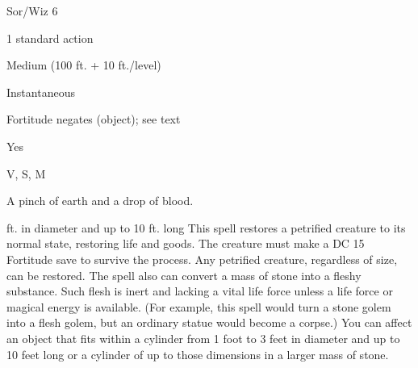 
\begin{description*}
\item[Level:] Sor/Wiz 6
\item[Casting Time:] 1 standard action
\item[Range:] Medium (100 ft. + 10 ft./level)
\item[Duration:] Instantaneous
\item[Saving Throw:] Fortitude negates (object); see text
\item[Spell Resistance:] Yes
\item[Components:] V, S, M
\item[Arcane Material Component:] A pinch of earth and a drop of blood.
\end{description*}

ft. in diameter and up to 10 ft. long
This spell restores a petrified creature to its normal state, restoring life and
goods. The creature must make a DC 15 Fortitude save to survive the process. Any
petrified creature, regardless of size, can be restored.
The spell also can convert a mass of stone into a fleshy substance. Such flesh
is inert and lacking a vital life force unless a life force or magical energy is
available. (For example, this spell would turn a stone golem into a flesh golem,
but an ordinary statue would become a corpse.) You can affect an object that fits
within a cylinder from 1 foot to 3 feet in diameter and up to 10 feet long or a
cylinder of up to those dimensions in a larger mass of stone.